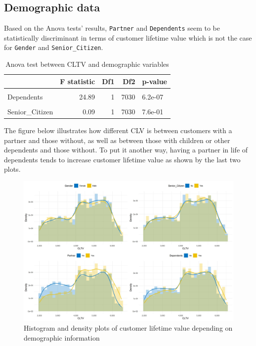 \documentclass[
]{book}
\begin{document}
\hypertarget{demographic-data-1}{%
\subsection*{Demographic data}\label{demographic-data-1}}

Based on the Anova tests' results, \texttt{Partner} and \texttt{Dependents} seem to be statistically discriminant in terms of customer lifetime value which is not the case for \texttt{Gender} and \texttt{Senior\_Citizen}.

\begin{table}[H]

\caption{\label{tab:aovdemographics}Anova test between CLTV and demographic variables}
\centering
\begin{tabular}[t]{lrrrl}
\toprule
  & F statistic & Df1 & Df2 & p-value\\
\midrule
\cellcolor{gray!6}{Partner} & \cellcolor{gray!6}{139.76} & \cellcolor{gray!6}{1} & \cellcolor{gray!6}{7030} & \cellcolor{gray!6}{6e-32}\\
Dependents & 24.89 & 1 & 7030 & 6.2e-07\\
\cellcolor{gray!6}{Gender} & \cellcolor{gray!6}{0.39} & \cellcolor{gray!6}{1} & \cellcolor{gray!6}{7030} & \cellcolor{gray!6}{5.3e-01}\\
Senior\_Citizen & 0.09 & 1 & 7030 & 7.6e-01\\
\bottomrule
\end{tabular}
\end{table}

The figure below illustrates how different CLV is between customers with a partner and those without, as well as between those with children or other dependents and those without. To put it another way, having a partner in life of dependents tends to increase customer lifetime value as shown by the last two plots.

\begin{figure}

{\centering \includegraphics[width=50in]{./imgs/cltv_demographics_plots} 

}

\caption{Histogram and density plots of customer lifetime value depending on demographic information}\label{fig:cltvdemographics}
\end{figure}
\end{document}
